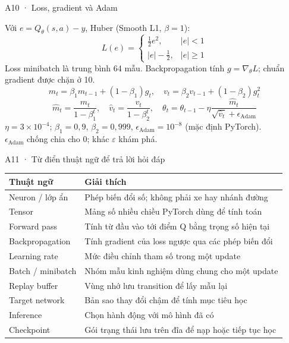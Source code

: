 \documentclass[aspectratio=169,10pt]{beamer}
\begin{document}
\begin{frame}{A10 · Loss, gradient và Adam}
\relax

\small
Với $e=Q_\theta(s,a)-y$, Huber (Smooth L1, $\beta=1$):
\[L(e)=\begin{cases}\tfrac12e^2,&|e|<1\\|e|-\tfrac12,&|e|\ge1\end{cases}\]
Loss minibatch là trung bình 64 mẫu. Backpropagation tính $g=\nabla_\theta L$; chuẩn gradient được chặn ở 10.
\[m_t=\beta_1m_{t-1}+(1-\beta_1)g_t,\quad
v_t=\beta_2v_{t-1}+(1-\beta_2)g_t^2\]
\[\hat m_t=\frac{m_t}{1-\beta_1^t},\quad \hat v_t=\frac{v_t}{1-\beta_2^t},\quad
\theta_t=\theta_{t-1}-\eta\frac{\hat m_t}{\sqrt{\hat v_t}+\epsilon_{\mathrm{Adam}}}\]
$\eta=3\times10^{-4}$; $\beta_1=0,9$, $\beta_2=0,999$, $\epsilon_{\mathrm{Adam}}=10^{-8}$ (mặc định PyTorch).\\[.1cm]
$\epsilon_{\mathrm{Adam}}$ chống chia cho 0; khác $\varepsilon$ khám phá.

\end{frame}
\begin{frame}{A11 · Từ điển thuật ngữ để trả lời hỏi đáp}
\relax

\small
\begin{tabular}{@{}P{3.3cm}P{9.1cm}@{}}\toprule
Thuật ngữ & Giải thích\\\midrule
Neuron / lớp ẩn & Phép biến đổi số; không phải xe hay nhánh đường\\
Tensor & Mảng số nhiều chiều PyTorch dùng để tính toán\\
Forward pass & Tính từ đầu vào tới điểm Q bằng trọng số hiện tại\\
Backpropagation & Tính gradient của loss ngược qua các phép biến đổi\\
Learning rate & Mức điều chỉnh tham số trong một update\\
Batch / minibatch & Nhóm mẫu kinh nghiệm dùng chung cho một update\\
Replay buffer & Vùng nhớ lưu transition để lấy mẫu lại\\
Target network & Bản sao thay đổi chậm để tính mục tiêu học\\
Inference & Chọn hành động với mô hình đã có\\
Checkpoint & Gói trạng thái lưu trên đĩa để nạp hoặc tiếp tục học\\\bottomrule\end{tabular}\par

\end{frame}
\end{document}
